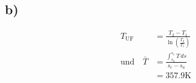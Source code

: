 

\subsection*{b)}

\begin{align*}
T_{\text{UF}} &= \frac{T_2 - T_1}{\ln \left( \frac{T_2}{T_1} \right)} \\
\text{und} \quad \bar{T} &= \frac{\int_{s_a}^{s_e} T \, ds}{s_e - s_a} \\
&= 357.9 \text{K}
\end{align*}